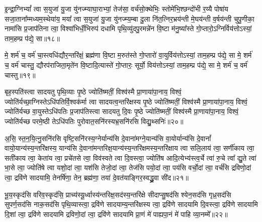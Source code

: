 {}

इ॒न्द्रा॒ग्नि\-भ्यां᳚ त्वा स॒युजा॑ यु॒जा यु॑नज्म्याघा॒राभ्यां॒ तेज॑सा॒ वर्च॑सो॒क्थेभिः॒ स्तोमे॑भि॒श्छन्दो॑भी र॒य्यै पोषा॑य सजा॒ताना᳚म्मध्यम॒स्थेया॑य॒ मया᳚ त्वा स॒युजा॑ यु॒जा यु॑नज्म्य॒म्बा दु॒ला नि॑त॒त्निर॒भ्रय॑न्ती मे॒घय॑न्ती व॒र्\mbox{}षय॑न्ती चुपु॒णीका॒ नामा॑सि प्र॒जाप॑तिना त्वा॒ विश्वा॑भिर्धी॒भिरुप॑ दधामि पृथि॒व्यु॑दपु॒रमन्ने॑न वि॒ष्टा म॑नु॒ष्या᳚स्ते गो॒प्तारो॒\-ऽग्निर्विय॑त्तो\-ऽस्यां॒ ताम॒हम्प्र प॑द्ये॒ सा॥१८॥

मे॒ शर्म॑ च॒ वर्म॑ चा॒स्त्वधि॑द्यौर॒न्तरि॑क्षं॒ ब्रह्म॑णा वि॒ष्टा म॒रुत॑स्ते गो॒प्तारो॑ वा॒युर्विय॑त्तो\-ऽस्यां॒ ताम॒हम्प्र प॑द्ये॒ सा मे॒ शर्म॑ च॒ वर्म॑ चास्तु॒ द्यौरप॑राजिता॒मृते॑न वि॒ष्टादि॒त्यास्ते॑ गो॒प्तारः॒ सूर्यो॒ विय॑त्तो\-ऽस्यां॒ ताम॒हम्प्र प॑द्ये॒ सा मे॒ शर्म॑ च॒ वर्म॑ चास्तु॥१९॥

{\anuvakamend[{सा\-ऽष्टाच॑त्वारिꣳशच्च॥५॥}]}

बृह॒स्पति॑स्त्वा सादयतु पृथि॒व्याः पृ॒ष्ठे ज्योति॑ष्मतीं॒ विश्व॑स्मै प्रा॒णाया॑पा॒नाय॒ विश्वं॒ ज्योति॑र्यच्छा॒ग्निस्ते\-ऽधि॑पतिर्\-वि॒श्वक॑र्मा त्वा सादयत्व॒न्तरि॑क्षस्य पृ॒ष्ठे ज्योति॑ष्मतीं॒ विश्व॑स्मै प्रा॒णाया॑पा॒नाय॒ विश्वं॒ ज्योति॑र्यच्छ वा॒युस्ते\-ऽधि॑पतिः प्र॒जाप॑तिस्त्वा सादयतु दि॒वः पृ॒ष्ठे ज्योति॑ष्मतीं॒ विश्व॑स्मै प्रा॒णाया॑पा॒नाय॒ विश्वं॒ ज्योति॑र्यच्छ परमे॒ष्ठी ते\-ऽधि॑पतिः पुरोवात॒सनि॑रस्यभ्र॒सनि॑रसि विद्यु॒थ्सनिः॑॥२०॥

अ॒सि॒ स्त॒न॒यि॒त्नु॒सनि॑रसि वृष्टि॒सनि॑रस्य॒ग्नेर्यान्य॑सि दे॒वाना॑मग्ने॒यान्य॑सि वा॒योर्यान्य॑सि दे॒वानां᳚ वायो॒यान्य॑स्य॒न्तरि॑क्षस्य॒ यान्य॑सि दे॒वाना॑मन्तरिक्ष॒यान्य॑स्य॒न्तरि॑क्षमस्य॒न्तरि॑क्षाय त्वा सलि॒लाय॑ त्वा॒ सर्णी॑काय त्वा॒ सती॑काय त्वा॒ केता॑य त्वा॒ प्रचे॑तसे त्वा॒ विव॑स्वते त्वा दि॒वस्त्वा॒ ज्योति॑ष आदि॒त्येभ्य॑स्त्व॒र्चे त्वा॑ रु॒चे त्वा᳚ द्यु॒ते त्वा॑ भा॒से त्वा॒ ज्योति॑षे त्वा यशो॒दां त्वा॒ यश॑सि तेजो॒दां त्वा॒ तेज॑सि पयो॒दां त्वा॒ पय॑सि वर्चो॒दां त्वा॒ वर्च॑सि द्रविणो॒दां त्वा॒ द्रवि॑णे सादयामि॒ तेनर्\mbox{}षि॑णा॒ तेन॒ ब्रह्म॑णा॒ तया॑ दे॒वत॑याङ्गिर॒स्वद्ध्रु॒वा सी॑द॥२१॥

{\anuvakamend[{वि॒द्यु॒थ्सनि॑र्द्यु॒त्वैका॒न्नत्रि॒ꣳ॒शच्च॑॥६॥}]}

भू॒य॒स्कृद॑सि वरिव॒स्कृद॑सि॒ प्राच्य॑स्यू॒र्ध्वास्य॑न्तरिक्ष॒सद॑स्य॒न्तरि॑क्षे सीदाप्सु॒षद॑सि श्येन॒सद॑सि गृध्र॒सद॑सि सुपर्ण॒सद॑सि नाक॒सद॑सि पृथि॒व्यास्त्वा॒ द्रवि॑णे सादयाम्य॒न्तरि॑क्षस्य त्वा॒ द्रवि॑णे सादयामि दि॒वस्त्वा॒ द्रवि॑णे सादयामि दि॒शां त्वा॒ द्रवि॑णे सादयामि द्रविणो॒दां त्वा॒ द्रवि॑णे सादयामि प्रा॒णं मे॑ पाह्यपा॒नं मे॑ पाहि व्या॒नम्मे᳚॥२२॥

